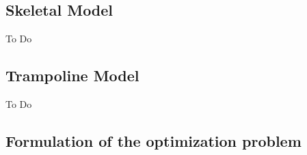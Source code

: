 \subsection{Skeletal Model}\label{subsec:2a}


To Do


\subsection{Trampoline Model}\label{subsec:2b}
To Do

\subsection{Formulation of the optimization problem}\label{subsec:2c}

